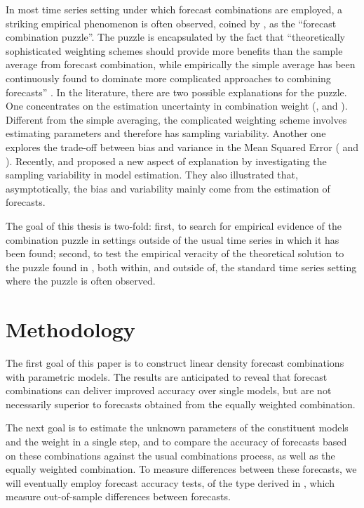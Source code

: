\documentclass{monashthesis}
\begin{document}
In most time series setting under which forecast combinations are employed, a striking empirical phenomenon is often observed, coined by \textcite{SW04}, as the ``forecast combination puzzle''. The puzzle is encapsulated by the fact that ``theoretically sophisticated weighting schemes should provide more benefits than the sample average from forecast combination, while empirically the simple average has been continuously found to dominate more complicated approaches to combining forecasts'' \autocite{WHLK22}. In the literature, there are two possible explanations for the puzzle. One concentrates on the estimation uncertainty in combination weight (\textcite{SW98}, \textcite{SW04} and \textcite{SW09}). Different from the simple averaging, the complicated weighting scheme involves estimating parameters and therefore has sampling variability. Another one explores the trade-off between bias and variance in the Mean Squared Error (\textcite{E11} and \textcite{CMVW16}). Recently, \textcite{ZMFP22} and \textcite{FZMP23} proposed a new aspect of explanation by investigating the sampling variability in model estimation. They also illustrated that, asymptotically, the bias and variability mainly come from the estimation of forecasts.

The goal of this thesis is two-fold: first, to search for empirical evidence of the combination puzzle in settings outside of the usual time series in which it has been found; second, to test the empirical veracity of the theoretical solution to the puzzle found in \textcite{FZMP23}, both within, and outside of, the standard time series setting where the puzzle is often observed.

\hypertarget{methodology}{%
\chapter{Methodology}\label{methodology}}

The first goal of this paper is to construct linear density forecast combinations with parametric models. The results are anticipated to reveal that forecast combinations can deliver improved accuracy over single models, but are not necessarily superior to forecasts obtained from the equally weighted combination.

The next goal is to estimate the unknown parameters of the constituent models and the weight in a single step, and to compare the accuracy of forecasts based on these combinations against the usual combinations process, as well as the equally weighted combination. To measure differences between these forecasts, we will eventually employ forecast accuracy tests, of the type derived in \textcite{W96}, which measure out-of-sample differences between forecasts.
\end{document}
